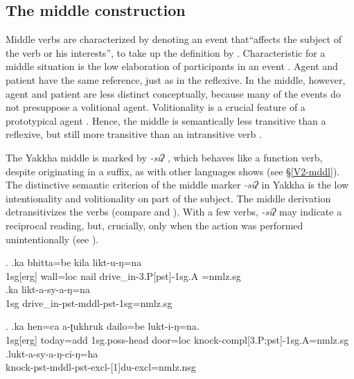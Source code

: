 \subsection{The middle construction}\label{middle}

Middle verbs are characterized by denoting an event that“affects the subject of the verb or his interests”, to take up the definition by \citet[373]{Lyons1969_Introduction}. Characteristic for a middle situation is the low elaboration of participants in an event \citep[3]{Kemmer1993_Middle}. Agent and patient have the same reference, just as in the reflexive. In the middle, however, agent and patient are less distinct conceptually, because many of the events do not presuppose a volitional agent. Volitionality is a crucial feature of a prototypical agent \citep{Hopperetal1980Transitivity, Foleyetal1984Functional}. Hence, the middle is semantically less transitive than a reflexive, but still more transitive than an intransitive verb  \citep[73]{Kemmer1993_Middle}. 

The Yakkha middle is marked by \emph{-siʔ} , which behaves like a function verb, despite originating in a suffix, as  with other  languages shows (see §\ref{V2-mddl}). The distinctive semantic criterion of the middle marker \emph{-siʔ} in Yakkha is the low intentionality and volitionality  on part of  the subject. The middle derivation detransitivizes the verbs (compare \Next[a] and \Next[b]). With a few verbs, \emph{-siʔ} may indicate a reciprocal reading, but, crucially, only when the action was performed unintentionally (see \NNext).

\ex. \ag.ka bhitta=be kila likt-u-ŋ=na\\
		{\sc 1sg[erg]} wall{\sc =loc} nail 	drive\_in-{\sc 3.P[pst]-1sg.A =nmlz.sg}	\\
 	\bg.ka  likt-a-sy-a-ŋ=na\\
		{\sc 1sg}  drive\_in{\sc -pst-mddl-pst-1sg=nmlz.sg} 		\\


\ex. \ag.ka hen=ca a-ʈukhruk dailo=be lukt-i-ŋ=na.\\
		{\sc 1sg[erg]} today{\sc =add} {\sc 1sg.poss}-head door{\sc =loc} knock{\sc -compl[3.P;pst]-1sg.A=nmlz.sg} \\
 	\bg.lukt-a-sy-a-ŋ-ci-ŋ=ha\\
	knock-{\sc pst-mddl-pst-excl-[1]du-excl=nmlz.nsg}	\\


